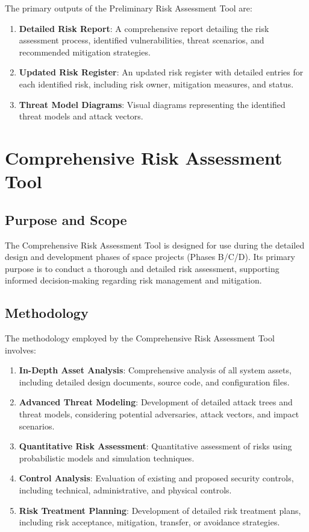 \documentclass[binding=0.6cm]{sapthesis}
\begin{document}
The primary outputs of the Preliminary Risk Assessment Tool are:

\begin{enumerate}
    \item \textbf{Detailed Risk Report}: A comprehensive report detailing the risk assessment process, identified vulnerabilities, threat scenarios, and recommended mitigation strategies.
    \item \textbf{Updated Risk Register}: An updated risk register with detailed entries for each identified risk, including risk owner, mitigation measures, and status.
    \item \textbf{Threat Model Diagrams}: Visual diagrams representing the identified threat models and attack vectors.
\end{enumerate}

\section{Comprehensive Risk Assessment Tool}

\subsection{Purpose and Scope}

The Comprehensive Risk Assessment Tool is designed for use during the detailed design and development phases of space projects (Phases B/C/D). Its primary purpose is to conduct a thorough and detailed risk assessment, supporting informed decision-making regarding risk management and mitigation.

\subsection{Methodology}

The methodology employed by the Comprehensive Risk Assessment Tool involves:

\begin{enumerate}
    \item \textbf{In-Depth Asset Analysis}: Comprehensive analysis of all system assets, including detailed design documents, source code, and configuration files.
    \item \textbf{Advanced Threat Modeling}: Development of detailed attack trees and threat models, considering potential adversaries, attack vectors, and impact scenarios.
    \item \textbf{Quantitative Risk Assessment}: Quantitative assessment of risks using probabilistic models and simulation techniques.
    \item \textbf{Control Analysis}: Evaluation of existing and proposed security controls, including technical, administrative, and physical controls.
    \item \textbf{Risk Treatment Planning}: Development of detailed risk treatment plans, including risk acceptance, mitigation, transfer, or avoidance strategies.
\end{enumerate}
\end{document}
